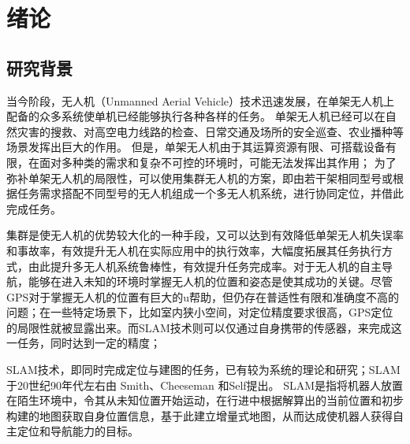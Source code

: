 \renewcommand{\baselinestretch}{1.5}
\fontsize{12pt}{13pt}\selectfont

\chapter{绪论}\label{preface}

\section{研究背景}

当今阶段，无人机（Unmanned Aerial Vehicle）技术迅速发展，在单架无人机上配备的众多系统使单机已经能够执行各种各样的任务。
单架无人机已经可以在自然灾害的搜救、对高空电力线路的检查、日常交通及场所的安全巡查、农业播种等场景发挥出巨大的作用。
但是，单架无人机由于其运算资源有限、可搭载设备有限，在面对多种类的需求和复杂不可控的环境时，可能无法发挥出其作用；
为了弥补单架无人机的局限性，可以使用集群无人机的方案，即由若干架相同型号或根据任务需求搭配不同型号的无人机组成一个多无人机系统，进行协同定位，并借此完成任务。


集群是使无人机的优势较大化的一种手段，又可以达到有效降低单架无人机失误率和事故率，有效提升无人机在实际应用中的执行效率，大幅度拓展其任务执行方式，由此提升多无人机系统鲁棒性，有效提升任务完成率。对于无人机的自主导航，能够在进入未知的环境时掌握无人机的位置和姿态是使其成功的关键。尽管GPS对于掌握无人机的位置有巨大的u帮助，但仍存在普适性有限和准确度不高的问题；在一些特定场景下，比如室内狭小空间，对定位精度要求很高，GPS定位的局限性就被显露出来。而SLAM技术则可以仅通过自身携带的传感器，来完成这一任务，同时达到一定的精度；

SLAM技术，即同时完成定位与建图的任务，已有较为系统的理论和研究；SLAM于20世纪90年代左右由 Smith、Cheeseman 和Self提出。
SLAM是指将机器人放置在陌生环境中，令其从未知位置开始运动，在行进中根据解算出的当前位置和初步构建的地图获取自身位置信息，基于此建立增量式地图，从而达成使机器人获得自主定位和导航能力的目标\cite{王晨捷2020无人机视觉}。



